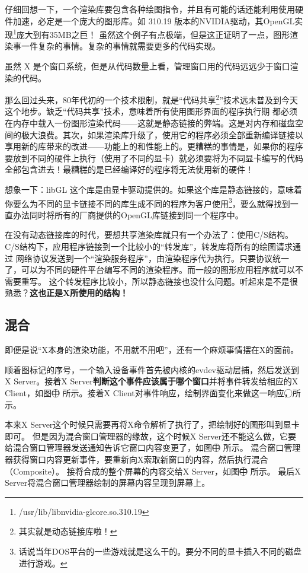 \documentclass[amstex,twoside]{ctexbook}
\begin{document}
仔细回想一下，一个渲染库要包含各种绘图指令，并且有可能的话还能利用使用硬件加速，必定是一个庞大的图形库。如 310.19 版本的NVIDIA驱动，其OpenGL实现\footnote{/usr/lib/libnvidia-glcore.so.310.19}庞大到有35MB之巨！ 
虽然这个例子有点极端，但是这正证明了一点，图形渲染事一件复杂的事情。复杂的事情就需要更多的代码实现。

虽然 X 是个窗口系统，但是从代码数量上看，管理窗口用的代码远远少于窗口渲染的代码。

那么回过头来，80年代初的一个技术限制，就是“代码共享\footnote{其实就是动态链接库啦！}”技术远未普及到今天这个地步。缺乏“代码共享”技术，意味着所有使用图形界面的程序执行期
都必须在内存中载入一份图形渲染代码——这就是静态链接的弊端。这是对内存和磁盘空间的极大浪费。其次，如果渲染库升级了，使用它的程序必须全部重新编译链接以享用新的库带来的改进——功能上的和性能上的。更糟糕的事情是，如果你的程序要放到不同的硬件上执行（使用了不同的显卡）就必须要将为不同显卡编写的代码全部包含进去！最糟糕的是已经编译好的程序将无法使用新的硬件！

想象一下：libGL 这个库是由显卡驱动提供的。如果这个库是静态链接的，意味着你要么为不同的显卡链接不同的库生成不同的程序为客户使用\footnote{话说当年DOS平台的一些游戏就是这么干的。要分不同的显卡插入不同的磁盘进行游戏。}，要么就得找到一直办法同时将所有的厂商提供的OpenGL库链接到同一个程序中。


在没有动态链接库的时代，要想共享渲染库就只有一个办法了：使用C/S结构。C/S结构下，应用程序链接到一个比较小的“转发库”，转发库将所有的绘图请求通过
网络协议发送到一个“渲染服务程序”，由渲染程序代为执行。只要协议统一了，可以为不同的硬件平台编写不同的渲染程序。而一般的图形应用程序就可以不需要重写。
这个转发程序比较小，所以静态链接也没什么问题。听起来是不是很熟悉？\textbf{这也正是X所使用的结构！}

\subsection{混合}

即便是说“X本身的渲染功能，不用就不用吧”，还有一个麻烦事情摆在X的面前。


顺着图\thefigure{}标记的序号，一个输入设备事件首先被内核的evdev驱动层捕，然后发送到X Server。接着X Server\textbf{判断这个事件应该属于哪个窗口}并将事件转发给相应的X Client，如图中\textcircled{} 所示。接着X Client对事件响应，绘制界面变化来做这一响应，\textcircled{}所示。

本来X Server这个时候只需要再将X命令解析了执行了，把绘制好的图形叫到显卡即可。
但是因为混合窗口管理器的缘故，这个时候X Server还不能这么做，它要给混合窗口管理器发送通知告诉它窗口内容变更了，如图中\textcircled{} 所示。
混合窗口管理器获得窗口内容更新事件，要重新向X索取新窗口的内容，然后执行混合（Composite）。
接将合成的整个屏幕的内容交给X Server，如图中\textcircled{} 所示。
最后X Server将混合窗口管理器绘制的屏幕内容呈现到屏幕上。
\end{document}
